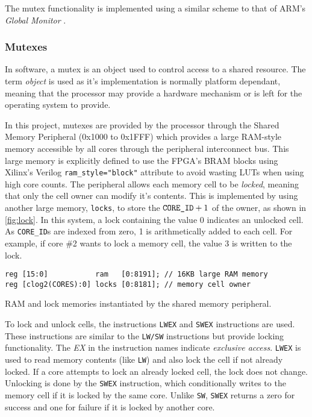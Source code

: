 The mutex functionality is implemented using a similar scheme to that of ARM's \textit{Global Monitor} \cite{armgmonitor}.

\subsubsection{Mutexes}
In software, a mutex is an object used to control access to a shared resource. The term \textit{object} is used as it's implementation is normally platform dependant, meaning that the processor may provide a hardware mechanism or is left for the operating system to provide.

In this project, mutexes are provided by the processor through the Shared Memory Peripheral (0x1000 to 0x1FFF) which provides a large RAM-style memory accessible by all cores through the peripheral interconnect bus. This large memory is explicitly defined to use the FPGA's BRAM blocks using Xilinx's Verilog \verb|ram_style="block"| attribute to avoid wasting LUTs when using high core counts. The peripheral allows each memory cell to be \textit{locked}, meaning that only the cell owner can modify it's contents. This is implemented by using another large memory, \verb|locks|, to store the $\verb|CORE_ID| + 1$ of the owner, as shown in \cref{fig:lock}. In this system, a lock containing the value 0 indicates an unlocked cell. As \verb|CORE_ID|s are indexed from zero, 1 is arithmetically added to each cell. For example, if core \#2 wants to lock a memory cell, the value 3 is written to the lock.

\begin{listing}[h]
\centering
\begin{verbatim}
reg [15:0]           ram   [0:8191]; // 16KB large RAM memory
reg [clog2(CORES):0] locks [0:8181]; // memory cell owner
\end{verbatim}
\caption{RAM and lock memories instantiated by the shared memory peripheral.}
\label{fig:lock}
\end{listing}

To lock and unlock cells, the instructions \verb|LWEX| and \verb|SWEX| instructions are used. These instructions are similar to the \verb|LW/SW| instructions but provide locking functionality. The \textit{EX} in the instruction names indicate \textit{exclusive access}. \verb|LWEX| is used to read memory contents  (like \verb|LW|) and also lock the cell if not already locked. If a core attempts to lock an already locked cell, the lock does not change. Unlocking is done by the \verb|SWEX| instruction, which conditionally writes to the memory cell if it is locked by the same core. Unlike \verb|SW|, \verb|SWEX| returns a zero for success and one for failure if it is locked by another core.

